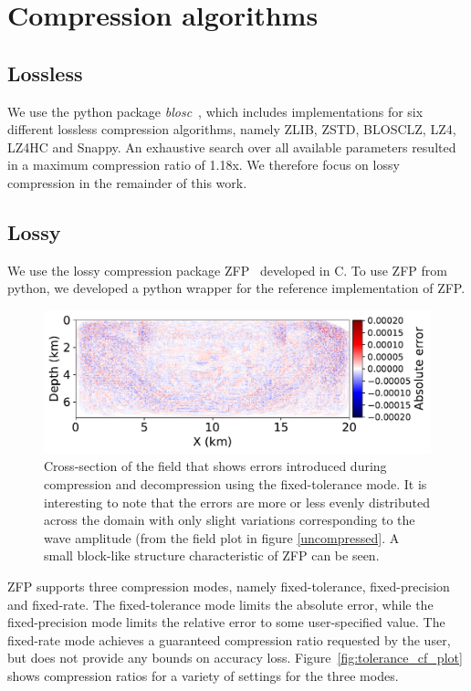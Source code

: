 \documentclass[conference]{IEEEtran}
\begin{document}
\section{Compression algorithms}
\subsection{Lossless}
We use the python package \emph{blosc}~\cite{blosc}, which includes implementations for
six different lossless compression algorithms, namely ZLIB, ZSTD, BLOSCLZ,
LZ4, LZ4HC and Snappy. An exhaustive search over all available parameters 
resulted in a maximum compression ratio of 1.18x. We therefore focus on lossy
compression in the remainder of this work.

\subsection{Lossy}
We use the lossy compression package ZFP~\cite{lindstrom2014fixed} developed in
C. To use ZFP from python, we developed a python wrapper for the reference
implementation of ZFP.

\begin{figure}
\begin{center}
\includegraphics[width=0.8\linewidth]{images/errors.pdf}
\end{center}
\caption{Cross-section of the field that shows errors introduced
  during compression and decompression using the fixed-tolerance
  mode. It is interesting to note that the errors are more or less
  evenly distributed across the domain with only slight variations
  corresponding to the wave amplitude (from the field plot in figure
  \ref{uncompressed}. A small block-like structure characteristic of
  ZFP can be seen.}
\label{fig:decompressed_error}
\end{figure}

ZFP supports three compression modes, namely fixed-tolerance, fixed-precision
and fixed-rate. The fixed-tolerance mode limits the absolute error, while the
fixed-precision mode limits the relative error to some user-specified value.
The fixed-rate mode achieves a guaranteed compression ratio requested by the
user, but does not provide any bounds on accuracy loss.
Figure~\ref{fig:tolerance_cf_plot} shows compression ratios for a variety of
settings for the three modes.
\end{document}
